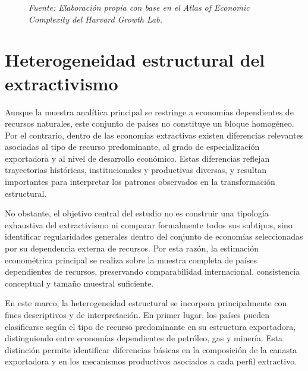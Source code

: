 \documentclass[../../TFM.tex]{subfiles}
\begin{document}
\begin{figure}[htbp]

		\caption[Selección de la muestra]{Procedimiento reproducible de selección de países utilizado para construir la muestra analítica del estudio. La regla única aplica $\theta=20\%$ sobre la dependencia externa de recursos, medida mediante $DRES$. Los conteos corresponden a los resultados efectivos del procesamiento del período 1990--1995.}

		\label{fig:sample_selection_pipeline}
		\caption*{\footnotesize \textit{Fuente: Elaboración propia con base en el Atlas of Economic Complexity del Harvard Growth Lab.}}

	\end{figure}

	\section{Heterogeneidad estructural del extractivismo}
	\label{sec:heterogeneidad-estructural}

	Aunque la muestra analítica principal se restringe a economías
	dependientes de recursos naturales, este conjunto de países no constituye
	un bloque homogéneo. Por el contrario, dentro de las economías
	extractivas existen diferencias relevantes asociadas al tipo de recurso
	predominante, al grado de especialización exportadora y al nivel de
	desarrollo económico. Estas diferencias reflejan trayectorias históricas,
	institucionales y productivas diversas, y resultan importantes para
	interpretar los patrones observados en la transformación estructural.

	No obstante, el objetivo central del estudio no es construir una tipología
	exhaustiva del extractivismo ni comparar formalmente todos sus subtipos,
	sino identificar regularidades generales dentro del conjunto de economías
	seleccionadas por su dependencia externa de recursos. Por esta razón, la
	estimación econométrica principal se realiza sobre la muestra completa de
	países dependientes de recursos, preservando comparabilidad
	internacional, consistencia conceptual y tamaño muestral suficiente.

	En este marco, la heterogeneidad estructural se incorpora principalmente
	con fines descriptivos y de interpretación. En primer lugar, los países
	pueden clasificarse según el tipo de recurso predominante en su estructura
	exportadora, distinguiendo entre economías dependientes de petróleo, gas y
	minería. Esta distinción permite
	identificar diferencias básicas en la composición de la canasta
	exportadora y en los mecanismos productivos asociados a cada perfil
	extractivo.
\end{document}
